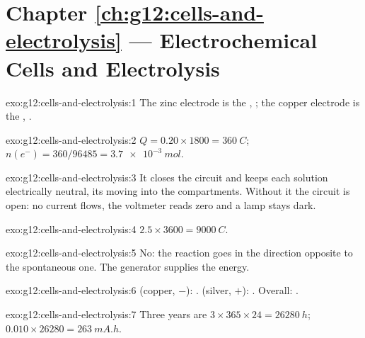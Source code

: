 \section*{Chapter \ref{ch:g12:cells-and-electrolysis} --- Electrochemical Cells and Electrolysis}

\begin{solution}{exo:g12:cells-and-electrolysis:1}
The zinc electrode is the , ; the copper
electrode is the , .
\end{solution}

\begin{solution}{exo:g12:cells-and-electrolysis:2}
$Q = 0.20 \times 1800 = \qty{360}{C}$; $n(e^-) = 360/96485 =
\qty{3.7e-3}{mol}$.
\end{solution}

\begin{solution}{exo:g12:cells-and-electrolysis:3}
It closes the circuit and keeps each solution electrically neutral, its
 moving into the compartments. Without it the circuit is open: no
current flows, the voltmeter reads zero and a lamp stays dark.
\end{solution}

\begin{solution}{exo:g12:cells-and-electrolysis:4}
$2.5 \times 3600 = \qty{9000}{C}$.
\end{solution}

\begin{solution}{exo:g12:cells-and-electrolysis:5}
No: the reaction goes in the direction opposite to the spontaneous one.
The generator supplies the energy.
\end{solution}

\begin{solution}{exo:g12:cells-and-electrolysis:6}
 (copper, $-$): .  (silver, $+$):
. Overall: .
\end{solution}

\begin{solution}{exo:g12:cells-and-electrolysis:7}
Three years are $3 \times 365 \times 24 = \qty{26280}{h}$;
$0.010 \times 26280 = \qty{263}{mA.h}$.
\end{solution}

